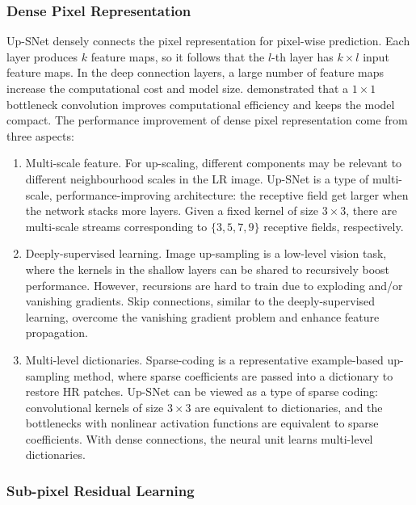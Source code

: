 \documentclass[runningheads]{llncs}
\begin{document}
\subsubsection{Dense Pixel Representation}
Up-SNet densely connects the pixel representation \cite{densenet} for pixel-wise prediction. Each layer produces $k$ feature maps, so it follows that the $l$-th layer has $k\times l$ input feature maps. In the deep connection layers, a large number of feature maps increase the computational cost and model size. \cite{reception} demonstrated that a $1 \times 1$ bottleneck convolution improves computational efficiency and keeps the model compact. The performance improvement of dense pixel representation come from three aspects:
\begin{enumerate}[(1)]
  \item Multi-scale feature. For up-scaling, different components may be relevant to different neighbourhood scales in the LR image. Up-SNet is a type of multi-scale, performance-improving architecture: the receptive field get larger when the network stacks more layers. Given a fixed kernel of size $3\times3$, there are multi-scale streams corresponding to $\{3, 5, 7, 9\}$ receptive fields, respectively.
  \item Deeply-supervised learning. Image up-sampling is a low-level vision task, where the kernels in the shallow layers can be shared to recursively boost performance. However, recursions are hard to train due to exploding and/or vanishing gradients. Skip connections, similar to the deeply-supervised learning, overcome the vanishing gradient problem and enhance feature propagation.
  \item Multi-level dictionaries. Sparse-coding is a representative example-based up-sampling method, where sparse coefficients are passed into a dictionary to restore HR patches. Up-SNet can be viewed as a type of sparse coding: convolutional kernels of size $3\times3$ are equivalent to dictionaries, and the bottlenecks with nonlinear activation functions are equivalent to sparse coefficients. With dense connections, the neural unit learns multi-level dictionaries. %
\end{enumerate}

\subsubsection{Sub-pixel Residual Learning}
\end{document}
